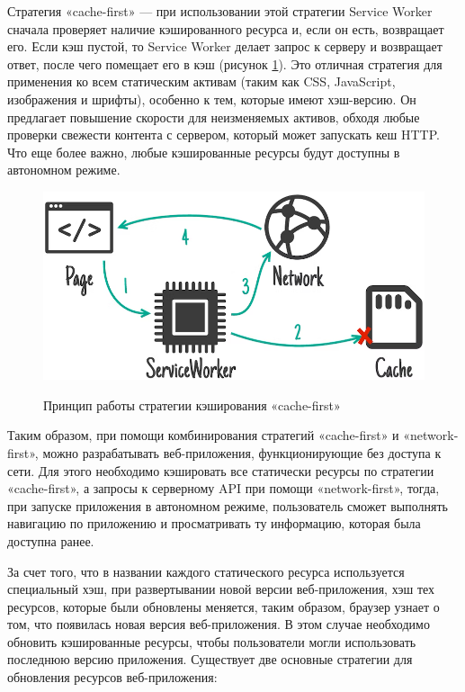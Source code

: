 Стратегия «cache-first» — при использовании этой стратегии Service Worker сначала проверяет наличие кэшированного ресурса и, если он есть, возвращает его. Если кэш пустой, то Service Worker делает запрос к серверу и возвращает ответ, после чего помещает его в кэш (рисунок \ref{fig:cache-first}). Это отличная стратегия для применения ко всем статическим активам (таким как CSS, JavaScript, изображения и шрифты), особенно к тем, которые имеют хэш-версию. Он предлагает повышение скорости для неизменяемых активов, обходя любые проверки свежести контента с сервером, который может запускать кеш HTTP. Что еще более важно, любые кэшированные ресурсы будут доступны в автономном режиме.

\begin{figure}[H]
\begin{center}
\includegraphics[width=1.0\hsize]{fig/cache-first.png}\\[2mm]
\caption{Принцип работы стратегии кэширования «cache-first»}\label{fig:cache-first}
\end{center}
\end{figure}

Таким образом, при помощи комбинирования стратегий «cache-first» и «network-first», можно разрабатывать веб-приложения, функционирующие без доступа к сети. Для этого необходимо кэшировать все статически ресурсы по стратегии «cache-first», а запросы к серверному API при помощи «network-first», тогда, при запуске приложения в автономном режиме, пользователь сможет выполнять навигацию по приложению и просматривать ту информацию, которая была доступна ранее.

За счет того, что в названии каждого статического ресурса используется специальный хэш, при развертывании новой версии веб-приложения, хэш тех ресурсов, которые были обновлены меняется, таким образом, браузер узнает о том, что появилась новая версия веб-приложения. В этом случае необходимо обновить кэшированные ресурсы, чтобы пользователи могли использовать последнюю версию приложения. Существует две основные стратегии для обновления ресурсов веб-приложения:

